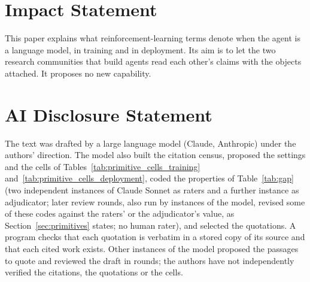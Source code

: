 \documentclass{article}
\begin{document}
\FloatBarrier
\section*{Impact Statement}
This paper explains what reinforcement-learning terms denote when the agent is a language model, in training and in deployment. Its aim is to let the two research communities that build agents read each other's claims with the objects attached. It proposes no new capability.

\section*{AI Disclosure Statement}
The text was drafted by a large language model (Claude, Anthropic) under the authors' direction. The model also built the citation census, proposed the settings and the cells of Tables~\ref{tab:primitive_cells_training} and~\ref{tab:primitive_cells_deployment}, coded the properties of Table~\ref{tab:gap} (two independent instances of Claude Sonnet as raters and a further instance as adjudicator; later review rounds, also run by instances of the model, revised some of these codes against the raters' or the adjudicator's value, as Section~\ref{sec:primitives} states; no human rater), and selected the quotations. A program checks that each quotation is verbatim in a stored copy of its source and that each cited work exists. Other instances of the model proposed the passages to quote and reviewed the draft in rounds; the authors have not independently verified the citations, the quotations or the cells.
\end{document}
